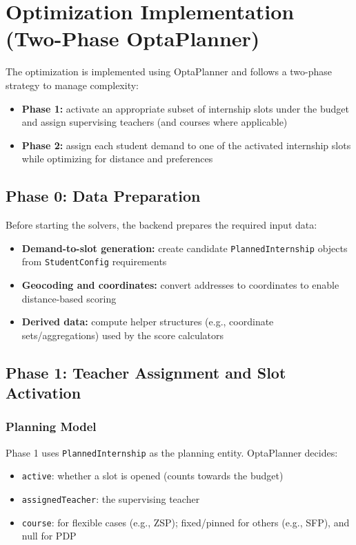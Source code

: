 \documentclass[12pt,a4paper]{report}
\begin{document}
\section{Optimization Implementation (Two-Phase OptaPlanner)}

The optimization is implemented using OptaPlanner and follows a two-phase strategy to manage complexity:

\begin{itemize}
    \item \textbf{Phase 1:} activate an appropriate subset of internship slots under the budget and assign supervising teachers (and courses where applicable)
    \item \textbf{Phase 2:} assign each student demand to one of the activated internship slots while optimizing for distance and preferences
\end{itemize}

\subsection{Phase 0: Data Preparation}

Before starting the solvers, the backend prepares the required input data:

\begin{itemize}
    \item \textbf{Demand-to-slot generation:} create candidate \texttt{PlannedInternship} objects from \texttt{StudentConfig} requirements
    \item \textbf{Geocoding and coordinates:} convert addresses to coordinates to enable distance-based scoring
    \item \textbf{Derived data:} compute helper structures (e.g., coordinate sets/aggregations) used by the score calculators
\end{itemize}

\subsection{Phase 1: Teacher Assignment and Slot Activation}

\subsubsection*{Planning Model}

Phase 1 uses \texttt{PlannedInternship} as the planning entity. OptaPlanner decides:

\begin{itemize}
    \item \texttt{active}: whether a slot is opened (counts towards the budget)
    \item \texttt{assignedTeacher}: the supervising teacher
    \item \texttt{course}: for flexible cases (e.g., ZSP); fixed/pinned for others (e.g., SFP), and null for PDP
\end{itemize}
\end{document}

